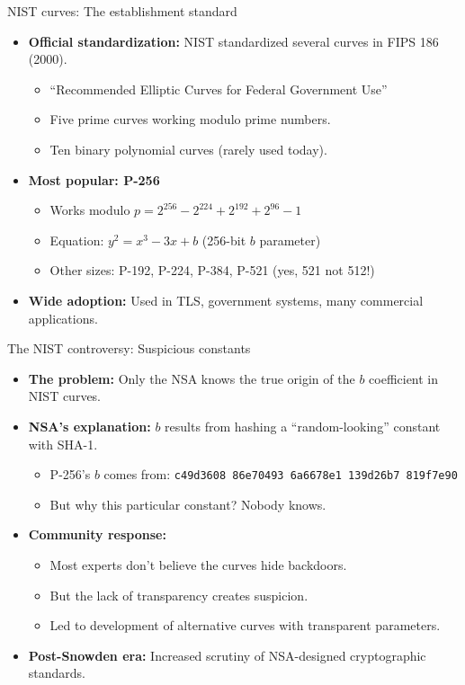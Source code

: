 \documentclass[aspectratio=169, lualatex, handout]{beamer}
\begin{document}
\begin{frame}{NIST curves: The establishment standard}
	\begin{itemize}[<+->]
		\item \textbf{Official standardization:} NIST standardized several curves in FIPS 186 (2000).
		      \begin{itemize}
			      \item ``Recommended Elliptic Curves for Federal Government Use''
			      \item Five prime curves working modulo prime numbers.
			      \item Ten binary polynomial curves (rarely used today).
		      \end{itemize}
		\item \textbf{Most popular: P-256}
		      \begin{itemize}
			      \item Works modulo $p = 2^{256} - 2^{224} + 2^{192} + 2^{96} - 1$
			      \item Equation: $y^2 = x^3 - 3x + b$ (256-bit $b$ parameter)
			      \item Other sizes: P-192, P-224, P-384, P-521 (yes, 521 not 512!)
		      \end{itemize}
		\item \textbf{Wide adoption:} Used in TLS, government systems, many commercial applications.
	\end{itemize}
\end{frame}

\begin{frame}{The NIST controversy: Suspicious constants}
	\begin{itemize}[<+->]
		\item \textbf{The problem:} Only the NSA knows the true origin of the $b$ coefficient in NIST curves.
		\item \textbf{NSA's explanation:} $b$ results from hashing a ``random-looking'' constant with SHA-1.
		      \begin{itemize}
			      \item P-256's $b$ comes from: \texttt{c49d3608 86e70493 6a6678e1 139d26b7 819f7e90}
			      \item But why this particular constant? Nobody knows.
		      \end{itemize}
		\item \textbf{Community response:}
		      \begin{itemize}
			      \item Most experts don't believe the curves hide backdoors.
			      \item But the lack of transparency creates suspicion.
			      \item Led to development of alternative curves with transparent parameters.
		      \end{itemize}
		\item \textbf{Post-Snowden era:} Increased scrutiny of NSA-designed cryptographic standards.
	\end{itemize}
\end{frame}
\end{document}
